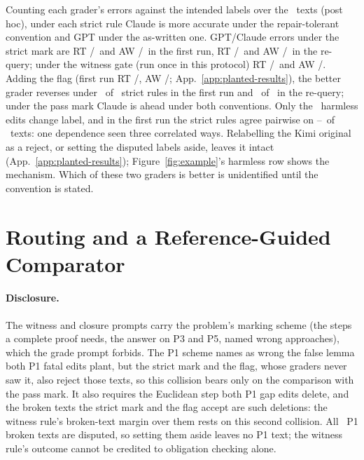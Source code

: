 \documentclass{article}
\begin{document}
Counting each grader's errors against the intended labels over the \CRNTexts\ texts (post hoc), under each strict rule Claude is more accurate under the repair-tolerant convention and GPT under the as-written one. GPT/Claude errors under the strict mark are RT \CRStrictErrRTGPTP/\CRStrictErrRTClaudeP\ and AW \CRStrictErrAWGPTP/\CRStrictErrAWClaudeP\ in the first run, RT \CRStrictErrRTGPTR/\CRStrictErrRTClaudeR\ and AW \CRStrictErrAWGPTR/\CRStrictErrAWClaudeR\ in the re-query; under the witness gate (run once in this protocol) RT \CRWitnessErrRTGPTP/\CRWitnessErrRTClaudeP\ and AW \CRWitnessErrAWGPTP/\CRWitnessErrAWClaudeP. Adding the flag (first run RT \CRFlagErrRTGPTP/\CRFlagErrRTClaudeP, AW \CRFlagErrAWGPTP/\CRFlagErrAWClaudeP; App.~\ref{app:planted-results}), the better grader reverses under \CRFlipRulesP\ of \CRFlipTotalP\ strict rules in the first run and \CRFlipRulesR\ of \CRFlipTotalR\ in the re-query; under the pass mark Claude is ahead under both conventions. Only the \CRNLabelChange\ harmless edits change label, and in the first run the strict rules agree pairwise on \CRAgreeMinP--\CRAgreeMaxP\ of \CRNTexts\ texts: one dependence seen three correlated ways. Relabelling the Kimi original as a reject, or setting the disputed labels aside, leaves it intact (App.~\ref{app:planted-results}); Figure~\ref{fig:example}'s harmless row shows the mechanism. Which of these two graders is better is unidentified until the convention is stated.

\section{Routing and a Reference-Guided Comparator}
\label{sec:routing}

\paragraph{Disclosure.} The witness and closure prompts carry the problem's marking scheme (the steps a complete proof needs, the answer on P3 and P5, named wrong approaches), which the grade prompt forbids. The P1 scheme names as wrong the false lemma both P1 fatal edits plant, but the strict mark and the flag, whose graders never saw it, also reject those texts, so this collision bears only on the comparison with the pass mark. It also requires the Euclidean step both P1 gap edits delete, and the broken texts the strict mark and the flag accept are such deletions: the witness rule's broken-text margin over them rests on this second collision. All \CRDisputedProbOne\ P1 broken texts are disputed, so setting them aside leaves no P1 text; the witness rule's outcome cannot be credited to obligation checking alone.
\end{document}
